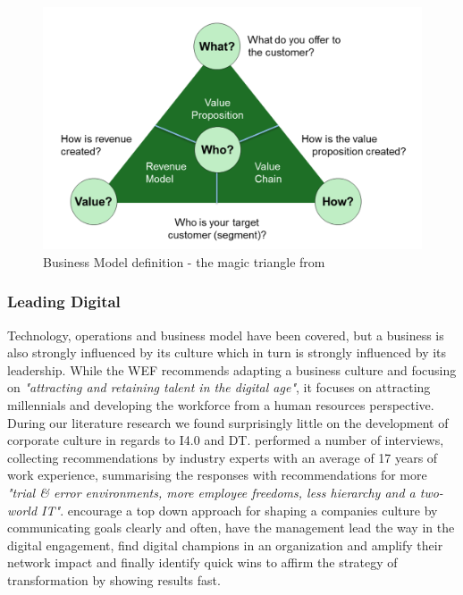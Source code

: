 \begin{figure}[H]
\centering
\includegraphics[width=1\columnwidth]{images/BMN}
\caption{Business Model definition - the magic triangle from \citeauthor{gassmann:gallen:2013geschaeftsmodelle}}
\label{fig:BMN}
\end{figure}


\subsubsection{Leading Digital}

Technology, operations and business model have been covered, but a business is also strongly influenced by its culture which in turn is strongly influenced by its leadership. While the \ac{WEF} recommends adapting a business culture and focusing on \emph{"attracting and retaining talent in the digital age"}\cite{worldforumdigitalenterprise:2016}, it focuses on attracting millennials and developing the workforce from a human resources perspective. During our literature research we found surprisingly little on the development of corporate culture in regards to \ac{I4.0} and \ac{DT}. \citeauthor{hammer:2015} performed a number of interviews, collecting recommendations by industry experts with an average of 17 years of work experience, summarising the responses with recommendations for more \emph{"trial \& error environments, more employee freedoms, less hierarchy and a two-world IT"}. \citeauthor{bonnect2014leading} encourage a top down approach for shaping a companies culture by communicating goals clearly and often, have the management lead the way in the digital engagement, find digital champions in an organization and amplify their network impact and finally identify quick wins to affirm the strategy of transformation by showing results fast. 


